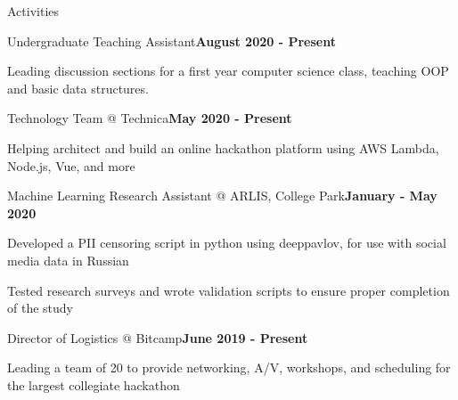 \documentclass[mm,centered]{resume} %
\begin{document}
\begin{rSection}{Activities} 
	
	\begin{rSubsection}{Undergraduate Teaching Assistant}{\textbf{August 2020 - Present}}{}{}
		\item Leading discussion sections for a first year computer science class, teaching OOP and basic data structures.
	\end{rSubsection}
	
	\begin{rSubsection}{Technology Team @ Technica}{\textbf{May 2020 - Present}}{}{}
		\item Helping architect and build an online hackathon platform using AWS Lambda, Node.js, Vue, and more
	\end{rSubsection}
	
	\begin{rSubsection}{Machine Learning Research Assistant @ ARLIS, College Park}{\textbf{January - May 2020}}{}{}
		\item Developed a PII censoring script in python using deeppavlov, for use with social media data in Russian
		\item Tested research surveys and wrote validation scripts to ensure proper completion of the study
	\end{rSubsection}
	
	\begin{rSubsection}{Director of Logistics @ Bitcamp}{\textbf{June 2019 - Present}}{}{}
		\item Leading a team of 20 to provide networking, A/V, workshops, and scheduling for the largest collegiate hackathon
	\end{rSubsection}
	
\end{rSection}
\end{document}
